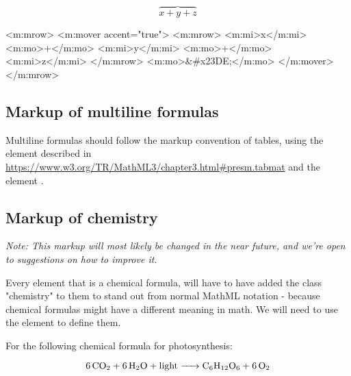 \documentclass[english,a4paper,11pt]{article}
\begin{document}
\begin{eksempler}
\begin{eksempler}
	\begin{equation}
		\overbrace{x+y+z}
	\end{equation}

	\begin{kodeblokk}
	\begin{verbatimtab}[3]
		<m:mrow>
			<m:mover accent="true">
				<m:mrow>
					<m:mi>x</m:mi>
					<m:mo>+</m:mo>
					<m:mi>y</m:mi>
					<m:mo>+</m:mo>
					<m:mi>z</m:mi>
				</m:mrow>
				<m:mo>&#x23DE;</m:mo>
			</m:mover>
	  	</m:mrow>
	\end{verbatimtab}
	\end{kodeblokk}
\end{eksempler}

\subsection{Markup of multiline formulas}

Multiline formulas should follow the markup convention of tables, using the  element described in \url{https://www.w3.org/TR/MathML3/chapter3.html#presm.tabmat} and the element .

\subsection{Markup of chemistry}

\textit{Note: This markup will most likely be changed in the near future, and we're open to suggestions on how to improve it.}

Every  element that is a chemical formula, will have to have added the class "chemistry" to them to stand out from normal MathML notation - because chemical formulas might have a different meaning in math. We will need to use the  element to define them. 

For the following chemical formula for photosynthesis:

\begin{eksempler}
\begin{equation}
    \ce{6 CO_2 + 6 H_2O + light -> C_6H_12O_6 + 6 O_2}
\end{equation}


\end{eksempler}
\end{eksempler}
\end{document}
